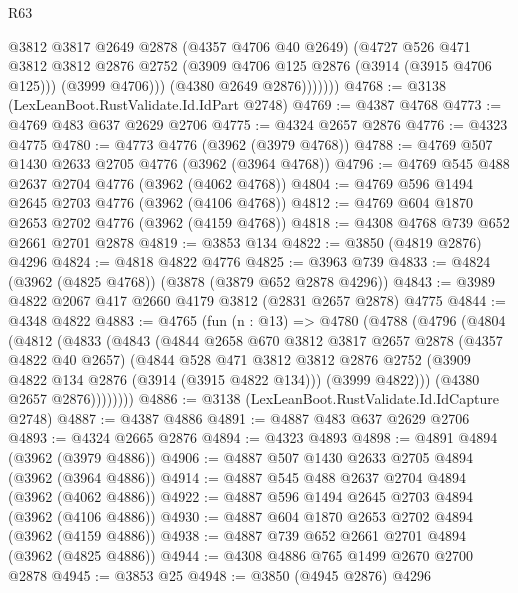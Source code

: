 \begin{lexlean}{R63}
\begin{coremodule}
                  @3812
                  @3817
                  @2649
                  @2878
                  (@4357 @4706 @40 @2649)
                  (@4727
                    @526
                    @471
                    @3812
                    @3812
                    @2876
                    @2752
                    (@3909 @4706 @125 @2876 (@3914 (@3915 @4706 @125)))
                    (@3999 @4706)))
                (@4380 @2649 @2876)))))))
@4768 := @3138 (LexLeanBoot.RustValidate.Id.IdPart @2748)
@4769 := @4387 @4768
@4773 := @4769 @483 @637 @2629 @2706
@4775 := @4324 @2657 @2876
@4776 := @4323 @4775
@4780 := @4773 @4776 (@3962 (@3979 @4768))
@4788 := @4769 @507 @1430 @2633 @2705 @4776 (@3962 (@3964 @4768))
@4796 := @4769 @545 @488 @2637 @2704 @4776 (@3962 (@4062 @4768))
@4804 := @4769 @596 @1494 @2645 @2703 @4776 (@3962 (@4106 @4768))
@4812 := @4769 @604 @1870 @2653 @2702 @4776 (@3962 (@4159 @4768))
@4818 := @4308 @4768 @739 @652 @2661 @2701 @2878
@4819 := @3853 @134
@4822 := @3850 (@4819 @2876) @4296
@4824 := @4818 @4822 @4776
@4825 := @3963 @739
@4833 := @4824 (@3962 (@4825 @4768)) (@3878 (@3879 @652 @2878 @4296))
@4843 := @3989 @4822 @2067 @417 @2660 @4179 @3812 (@2831 @2657 @2878) @4775
@4844 := @4348 @4822
@4883 := @4765
    (fun (n : @13) =>
    @4780
      (@4788
        (@4796
          (@4804
            (@4812
              (@4833
                (@4843
                  (@4844
                    @2658
                    @670
                    @3812
                    @3817
                    @2657
                    @2878
                    (@4357 @4822 @40 @2657)
                    (@4844
                      @528
                      @471
                      @3812
                      @3812
                      @2876
                      @2752
                      (@3909 @4822 @134 @2876 (@3914 (@3915 @4822 @134)))
                      (@3999 @4822)))
                  (@4380 @2657 @2876))))))))
@4886 := @3138 (LexLeanBoot.RustValidate.Id.IdCapture @2748)
@4887 := @4387 @4886
@4891 := @4887 @483 @637 @2629 @2706
@4893 := @4324 @2665 @2876
@4894 := @4323 @4893
@4898 := @4891 @4894 (@3962 (@3979 @4886))
@4906 := @4887 @507 @1430 @2633 @2705 @4894 (@3962 (@3964 @4886))
@4914 := @4887 @545 @488 @2637 @2704 @4894 (@3962 (@4062 @4886))
@4922 := @4887 @596 @1494 @2645 @2703 @4894 (@3962 (@4106 @4886))
@4930 := @4887 @604 @1870 @2653 @2702 @4894 (@3962 (@4159 @4886))
@4938 := @4887 @739 @652 @2661 @2701 @4894 (@3962 (@4825 @4886))
@4944 := @4308 @4886 @765 @1499 @2670 @2700 @2878
@4945 := @3853 @25
@4948 := @3850 (@4945 @2876) @4296

\end{coremodule}
\end{lexlean}
